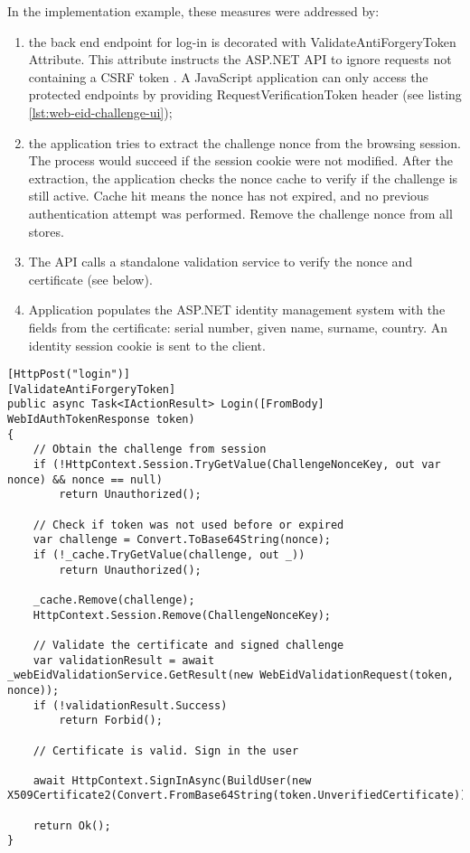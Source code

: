 In the implementation example, these measures were addressed by:
\begin{enumerate}
  \item the back end endpoint for log-in is decorated with ValidateAntiForgeryToken Attribute. This attribute instructs the ASP.NET API to ignore requests not containing a CSRF token \cite{msdocs-anti-request-forgery}. A JavaScript application can only access the protected endpoints by providing RequestVerificationToken header (see listing \ref{lst:web-eid-challenge-ui});
  \item the application tries to extract the challenge nonce from the browsing session. The process would succeed if the session cookie were not modified. After the extraction, the application checks the nonce cache to verify if the challenge is still active. Cache hit means the nonce has not expired, and no previous authentication attempt was performed. Remove the challenge nonce from all stores.
  \item The API calls a standalone validation service to verify the nonce and certificate (see below).
  \item Application populates the ASP.NET identity management system with the fields from the certificate: serial number, given name, surname, country. An identity session cookie is sent to the client.
\end{enumerate}

\begin{lstlisting}[caption={Web eID Login Endpoint}, label={lst:web-eid-login}]
[HttpPost("login")]
[ValidateAntiForgeryToken]
public async Task<IActionResult> Login([FromBody] WebIdAuthTokenResponse token)
{
    // Obtain the challenge from session
    if (!HttpContext.Session.TryGetValue(ChallengeNonceKey, out var nonce) && nonce == null)
        return Unauthorized();

    // Check if token was not used before or expired
    var challenge = Convert.ToBase64String(nonce);
    if (!_cache.TryGetValue(challenge, out _))
        return Unauthorized();

    _cache.Remove(challenge);
    HttpContext.Session.Remove(ChallengeNonceKey);

    // Validate the certificate and signed challenge
    var validationResult = await _webEidValidationService.GetResult(new WebEidValidationRequest(token, nonce));
    if (!validationResult.Success)
        return Forbid();

    // Certificate is valid. Sign in the user

    await HttpContext.SignInAsync(BuildUser(new X509Certificate2(Convert.FromBase64String(token.UnverifiedCertificate)).Subject));

    return Ok();
}
\end{lstlisting}


